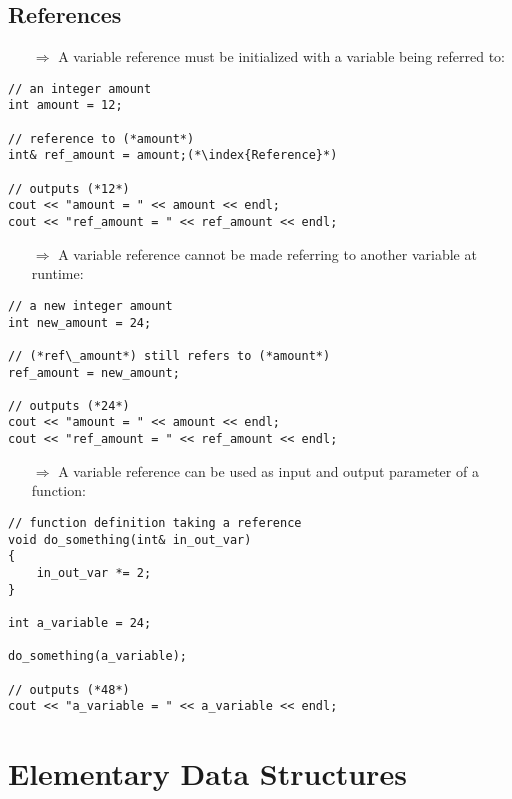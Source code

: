 \documentclass[10pt]{book}
\begin{document}
\section{References}
\begin{enumerate}
\item[$\Rightarrow$] A variable reference must be initialized with a variable being referred to:
\end{enumerate}
\begin{lstlisting}
// an integer amount
int amount = 12;

// reference to (*amount*)
int& ref_amount = amount;(*\index{Reference}*)

// outputs (*12*)
cout << "amount = " << amount << endl;
cout << "ref_amount = " << ref_amount << endl;
\end{lstlisting}
\begin{enumerate}
\item[$\Rightarrow$] A variable reference cannot be made referring to another variable at runtime:
\end{enumerate}
\begin{lstlisting}
// a new integer amount
int new_amount = 24;

// (*ref\_amount*) still refers to (*amount*)
ref_amount = new_amount;

// outputs (*24*)
cout << "amount = " << amount << endl;
cout << "ref_amount = " << ref_amount << endl;
\end{lstlisting}
\begin{enumerate}
\item[$\Rightarrow$] A variable reference can be used as input and output parameter of a function:
\end{enumerate}
\begin{lstlisting}
// function definition taking a reference
void do_something(int& in_out_var)
{
    in_out_var *= 2;
}

int a_variable = 24;

do_something(a_variable);

// outputs (*48*)
cout << "a_variable = " << a_variable << endl;
\end{lstlisting}
%
%
\chapter{Elementary Data Structures}
%
%
\end{document}
